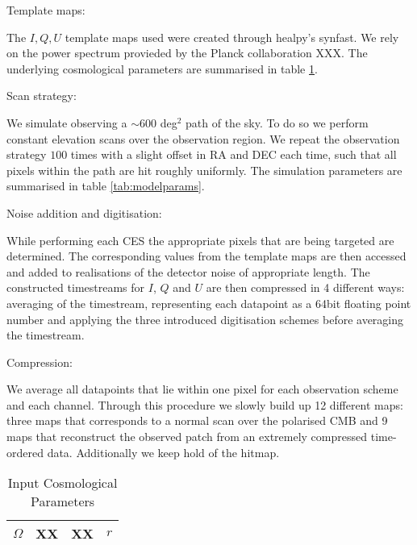 \documentclass[apj]{emulateapj}
\newcommand{\sqdeg}{deg$^2$ }
\begin{document}
Template maps:

The $I, Q, U$ template maps used were created through healpy's synfast. We rely on the power spectrum provieded by the Planck collaboration XXX. The underlying cosmological parameters are summarised in table \ref{tab:inputcosparams}.

Scan strategy:

We simulate observing a $\sim 600$ \sqdeg path of the sky. To do so we perform constant elevation scans over the observation region. We repeat the observation strategy $100$ times with a slight offset in RA and DEC each time, such that all pixels within the path are hit roughly uniformly. The simulation parameters are summarised in table \ref{tab:modelparams}.

Noise addition and digitisation:

While performing each CES the appropriate pixels that are being targeted are determined. The corresponding values from the template maps are then accessed and added to realisations of the detector noise of appropriate length. The constructed timestreams for $I$, $Q$ and $U$ are then compressed in 4 different ways: averaging of the timestream, representing each datapoint as a 64bit floating point number and applying the three introduced digitisation schemes before averaging the timestream.

Compression:

We average all datapoints that lie within one pixel for each observation scheme and each channel. Through this procedure we slowly build up 12 different maps: three maps that corresponds to a normal scan over the polarised CMB and 9 maps that reconstruct the observed patch from an extremely compressed time-ordered data. Additionally we keep hold of the hitmap.

\begin{table}[tbh]
\begin{center}
\caption{\label{tab:inputcosparams} Input Cosmological Parameters}
\small
\begin{tabular}{l | c c c }
$\Omega$ & XX&XX&$r$\\
\hline

\end{tabular}
 \normalsize
\end{center}
\end{table}
\end{document}
